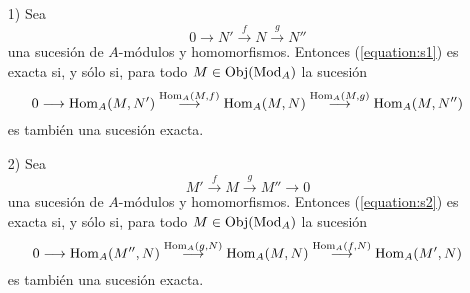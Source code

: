 \documentclass[../main.tex]{subfiles}
\begin{document}
\begin{proposition}\label{pry}
\begin{itemize}
    \item[1)] Sea\begin{equation}\label{equation:s1}
        0\longrightarrow N'\overset{f}{\longrightarrow}N\overset{g}{\longrightarrow}N''
    \end{equation}
    una sucesión de $A$-módulos y homomorfismos. Entonces (\ref{equation:s1}) es exacta si, y sólo si, para todo $M\in\operatorname{Obj}(\operatorname{Mod}_A)$ la sucesión\begin{equation}\label{equation:s1'}
        0\longrightarrow \operatorname{Hom}_A(M,N')\overset{\operatorname{Hom}_A(M,f)}{\longrightarrow}\operatorname{Hom}_A(M,N)\overset{\operatorname{Hom}_A(M,g)}{\longrightarrow}\operatorname{Hom}_A(M,N'')
    \end{equation}
    es también una sucesión exacta.
    \item[2)] Sea\begin{equation}\label{equation:s2}
        M'\overset{f}{\longrightarrow}M\overset{g}{\longrightarrow}M''\longrightarrow 0
    \end{equation}
    una sucesión de $A$-módulos y homomorfismos. Entonces (\ref{equation:s2}) es exacta si, y sólo si, para todo $M\in\operatorname{Obj}(\operatorname{Mod}_A)$ la sucesión
    \begin{equation}\label{equation:s2'}0\longrightarrow\operatorname{Hom}_A(M'',N)\overset{\operatorname{Hom}_A(g,N)}{\longrightarrow}\operatorname{Hom}_A(M,N)\overset{\operatorname{Hom}_A(f,N)}{\longrightarrow}\operatorname{Hom}_A(M',N)\end{equation}
    es también una sucesión exacta.
\end{itemize}
\end{proposition}
\end{document}
